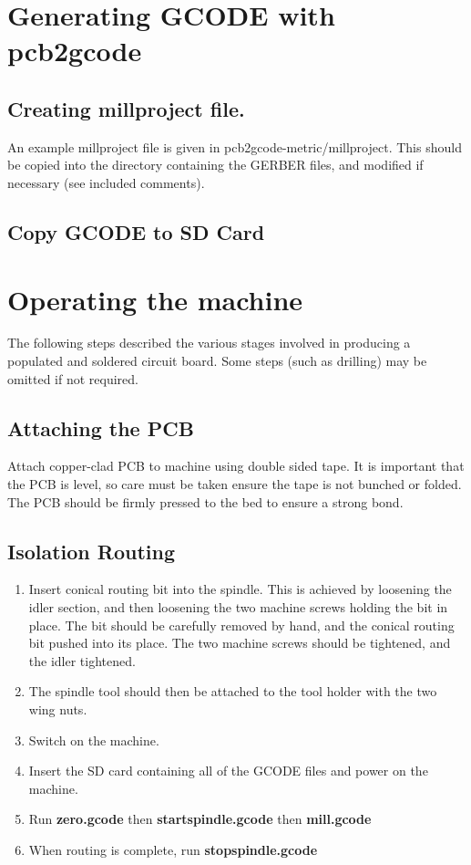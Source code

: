 \documentclass[a4paper,11pt]{article}  %
\begin{document}
\section{Generating GCODE with pcb2gcode}
\subsection{Creating millproject file.}
An example millproject file is given in pcb2gcode-metric/millproject. This should be copied
into the directory containing the GERBER files, and modified if necessary (see included comments).

\subsection{Copy GCODE to SD Card}

\section{Operating the machine}
The following steps described the various stages involved in producing
a populated and soldered circuit board. Some steps (such as drilling)
may be omitted if not required.

\subsection{Attaching the PCB}
Attach copper-clad PCB to machine using double sided tape. It is important that the PCB is level,
so care must be taken ensure the tape is not bunched or folded. The PCB should be firmly
pressed to the bed to ensure a strong bond.

\subsection{Isolation Routing}
\begin{enumerate}

\item
Insert conical routing bit into the spindle. This is achieved by loosening
the idler section, and then loosening the two machine screws holding the bit in place.
The bit should be carefully removed by hand, and the conical routing bit 
pushed into its place. The two machine screws should be tightened, and the idler
tightened.

\item
The spindle tool should then be attached to the tool holder with the two
wing nuts.

\item
Switch on the machine.

\item
Insert the SD card containing all of the GCODE files and power on the 
machine.

\item
Run \textbf{zero.gcode} then \textbf{startspindle.gcode} then \textbf{mill.gcode}

\item
When routing is complete, run \textbf{stopspindle.gcode}

\end{enumerate}
\end{document}
